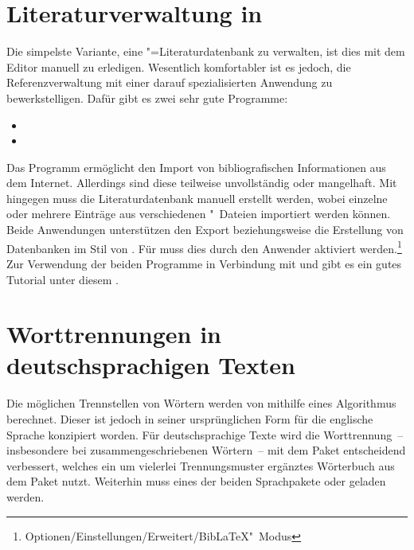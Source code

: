 \section{Literaturverwaltung in }
%
%
Die simpelste Variante, eine "=Literaturdatenbank zu verwalten, 
ist dies mit dem Editor manuell zu erledigen. Wesentlich komfortabler ist es 
jedoch, die Referenzverwaltung mit einer darauf spezialisierten Anwendung zu 
bewerkstelligen. Dafür gibt es zwei sehr gute Programme:
%
\begin{itemize}
\item {}
\item {}
\end{itemize}
%
Das Programm  ermöglicht den Import von bibliografischen 
Informationen aus dem Internet. Allerdings sind diese teilweise unvollständig 
oder mangelhaft. Mit  hingegen muss die Literaturdatenbank 
manuell erstellt werden, wobei einzelne oder mehrere Einträge aus verschiedenen
"~Dateien importiert werden können. Beide Anwendungen unterstützen 
den Export beziehungsweise die Erstellung von Datenbanken im Stil von 
. Für  muss dies durch den Anwender 
aktiviert werden.\footnote{Optionen/Einstellungen/Erweitert/BibLaTeX"~Modus} 
Zur Verwendung der beiden Programme in Verbindung mit  und 
 gibt es ein gutes Tutorial unter diesem
.



\section{%
  Worttrennungen in deutschsprachigen Texten%
  \label{sec:tips:hyphenation}%
}
%
%
Die möglichen Trennstellen von Wörtern werden von  mithilfe 
eines Algorithmus berechnet. Dieser ist jedoch in seiner ursprünglichen Form 
für die englische Sprache konzipiert worden. Für deutschsprachige Texte wird 
die Worttrennung~-- insbesondere bei zusammengeschriebenen Wörtern~-- mit dem 
Paket  entscheidend verbessert, welches ein um vielerlei 
Trennungsmuster ergänztes Wörterbuch aus dem Paket  
nutzt. Weiterhin muss eines der beiden Sprachpakete  oder
 geladen werden. 

